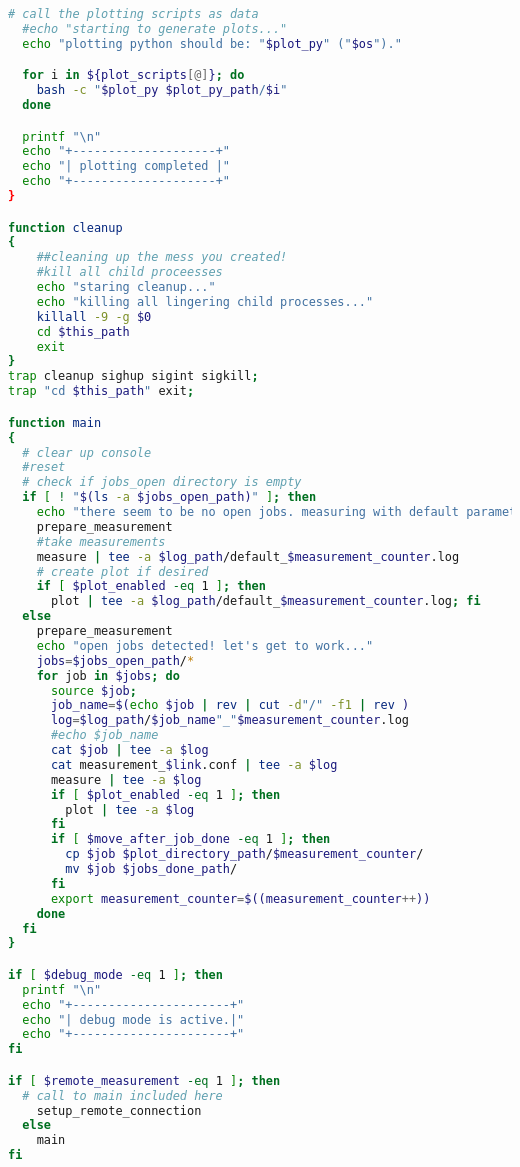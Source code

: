 \begin{lstlisting}[language=Bash,caption=measure.sh]
  # call the plotting scripts as data
  #echo "starting to generate plots..."
  echo "plotting python should be: "$plot_py" ("$os")."

  for i in ${plot_scripts[@]}; do
    bash -c "$plot_py $plot_py_path/$i"
  done

  printf "\n"
  echo "+--------------------+"
  echo "| plotting completed |"
  echo "+--------------------+"
}

function cleanup
{
    ##cleaning up the mess you created!
    #kill all child proceesses
    echo "staring cleanup..."
    echo "killing all lingering child processes..."
    killall -9 -g $0
    cd $this_path
    exit
}
trap cleanup sighup sigint sigkill;
trap "cd $this_path" exit;

function main
{
  # clear up console
  #reset
  # check if jobs_open directory is empty
  if [ ! "$(ls -a $jobs_open_path)" ]; then
    echo "there seem to be no open jobs. measuring with default parameters."
    prepare_measurement
    #take measurements
    measure | tee -a $log_path/default_$measurement_counter.log
    # create plot if desired
    if [ $plot_enabled -eq 1 ]; then
      plot | tee -a $log_path/default_$measurement_counter.log; fi
  else
    prepare_measurement
    echo "open jobs detected! let's get to work..."
    jobs=$jobs_open_path/*
    for job in $jobs; do
      source $job;
      job_name=$(echo $job | rev | cut -d"/" -f1 | rev )
      log=$log_path/$job_name"_"$measurement_counter.log
      #echo $job_name
      cat $job | tee -a $log
      cat measurement_$link.conf | tee -a $log
      measure | tee -a $log
      if [ $plot_enabled -eq 1 ]; then
        plot | tee -a $log
      fi
      if [ $move_after_job_done -eq 1 ]; then
        cp $job $plot_directory_path/$measurement_counter/
        mv $job $jobs_done_path/
      fi
      export measurement_counter=$((measurement_counter++))
    done
  fi
}

if [ $debug_mode -eq 1 ]; then
  printf "\n"
  echo "+----------------------+"
  echo "| debug mode is active.|"
  echo "+----------------------+"
fi

if [ $remote_measurement -eq 1 ]; then
  # call to main included here
    setup_remote_connection
  else
    main
fi

\end{lstlisting}

